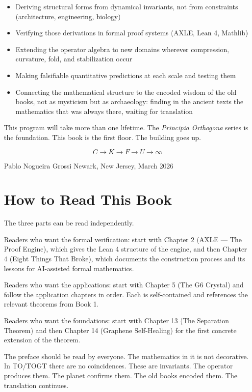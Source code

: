 \documentclass[19pt]{book}
\theoremstyle{plain}
\theoremstyle{definition}
\theoremstyle{remark}
\begin{document}
\begin{itemize}
\item Deriving structural forms from dynamical invariants, not from constraints (architecture, engineering, biology)
\item Verifying those derivations in formal proof systems (AXLE, Lean 4, Mathlib)
\item Extending the operator algebra to new domains wherever compression, curvature, fold, and stabilization occur
\item Making falsifiable quantitative predictions at each scale and testing them
\item Connecting the mathematical structure to the encoded wisdom of the old books, not as mysticism but as archaeology: finding in the ancient texts the mathematics that was always there, waiting for translation
\end{itemize}

This program will take more than one lifetime. The \emph{Principia Orthogona} series is the foundation. This book is the first floor. The building goes up.

\[
C \to K \to F \to U \to \infty
\]

Pablo Nogueira Grossi  
Newark, New Jersey, March 2026

\section{How to Read This Book}

The three parts can be read independently.

Readers who want the formal verification: start with Chapter 2 (AXLE — The Proof Engine), which gives the Lean 4 structure of the engine, and then Chapter 4 (Eight Things That Broke), which documents the construction process and its lessons for AI-assisted formal mathematics.

Readers who want the applications: start with Chapter 5 (The G6 Crystal) and follow the application chapters in order. Each is self-contained and references the relevant theorems from Book 1.

Readers who want the foundations: start with Chapter 13 (The Separation Theorem) and then Chapter 14 (Graphene Self-Healing) for the first concrete extension of the theorem.

The preface should be read by everyone. The mathematics in it is not decorative. In TO/TOGT there are no coincidences. These are invariants. The operator produces them. The planet confirms them. The old books encoded them. The translation continues.
\end{document}
